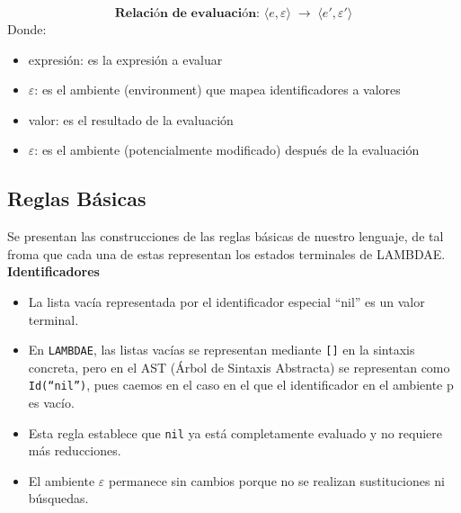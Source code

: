 \documentclass[a4paper,12pt]{article}
\begin{document}
\begin{tcolorbox}[title= Correción: Reglas de paso pequeño LAMBDAE   MÓDULO A5,breakable]
    
\[
\textbf{Relación de evaluación: } \langle e, \varepsilon \rangle \;\longrightarrow\; \langle e', \varepsilon' \rangle
\]
Donde:

\begin{itemize}
    \item expresión: es la expresión a evaluar
    \item $\varepsilon$: es el ambiente (environment) que mapea identificadores a valores
    \item valor: es el resultado de la evaluación
    \item $\varepsilon$: es el ambiente (potencialmente modificado) después de la evaluación
\end{itemize}



\bigskip


\subsection{\textbf{Reglas Básicas}}

Se presentan las construcciones de las reglas básicas de nuestro lenguaje, de tal froma que cada una de estas representan los estados terminales de LAMBDAE.\\

\textbf{Identificadores}
\begin{center}
\begin{mathpar}
\end{mathpar}
\end{center}

\begin{itemize}
    \item La lista vacía representada por el identificador especial ``nil'' es un valor terminal. 
    \item En \texttt{LAMBDAE}, las listas vacías se representan mediante \texttt{[]} en la sintaxis concreta, pero en el AST (Árbol de Sintaxis Abstracta) se representan como \texttt{Id(``nil'')}, pues caemos en el caso en el que el identificador en el ambiente p es vacío. 
    \item Esta regla establece que \texttt{nil} ya está completamente evaluado y no requiere más reducciones. 
    \item El ambiente $\varepsilon$ permanece sin cambios porque no se realizan sustituciones ni búsquedas.
\end{itemize}


\end{tcolorbox}
\end{document}
